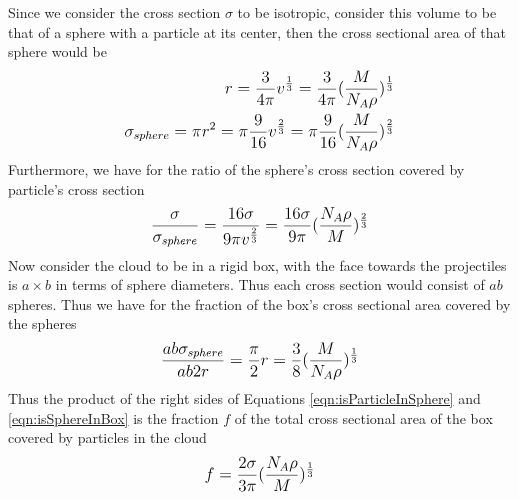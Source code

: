 \documentclass[12pt]{article}
\begin{document}
Since we consider the cross section $\sigma$ to be isotropic, consider this volume to be that of a sphere with a particle at its center, then the cross sectional area of that sphere would be 
\begin{equation}
\begin{split}
\mathlarger{
r = \frac{3}{4\pi}v^{\frac{1}{3}} = \frac{3}{4\pi}(\frac{M}{N_A\rho})^{\frac{1}{3}} 
}\\
\mathlarger{
\sigma_{sphere} = \pi r^2 = \pi\frac{9}{16}v^{\frac{2}{3}} = \pi\frac{9}{16}(\frac{M}{N_A\rho})^{\frac{2}{3}}
}\\
\end{split}
\end{equation}
Furthermore, we have for the ratio of the sphere's cross section covered by particle's cross section 
\begin{equation}\label{eqn:isParticleInSphere}
\begin{split}    
\mathlarger{
\frac{\sigma}{\sigma_{sphere}} = \frac{16\sigma}{9\pi v^{\frac{2}{3}}} = 
\frac{16\sigma}{9\pi}(\frac{N_A\rho}{M})^{\frac{2}{3}}
}\\
\end{split}
\end{equation}
Now consider the cloud to be in a rigid box, with the face towards the projectiles is $a\times b$ in terms of sphere diameters. Thus each cross section would consist of $ab$ spheres. Thus we have for the fraction of the box's cross sectional area covered by the spheres 
\begin{equation}\label{eqn:isSphereInBox}
\begin{split}
\mathlarger{
\frac{ab\sigma_{sphere}}{ab2r} = \frac{\pi}{2} r = \frac{3}{8}(\frac{M}{N_A\rho})^{\frac{1}{3}} 
}\\
\end{split}
\end{equation}
Thus the product of the right sides of Equations \ref{eqn:isParticleInSphere} and \ref{eqn:isSphereInBox} is the fraction $f$ of the total cross sectional area of the box covered by particles in the cloud 
\begin{equation}\label{eqn:isParticleInBox}
\begin{split}
\mathlarger{
f = \frac{2\sigma}{3\pi}(\frac{N_A\rho}{M})^{\frac{1}{3}}
}\\
\end{split}
\end{equation}
\end{document}
